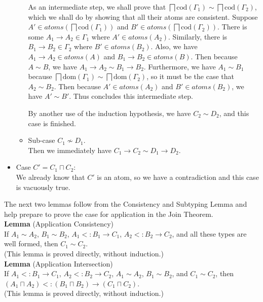 \documentclass{article}
\newcommand{\ATOMS}[1]{\mathit{atoms}(#1)}
\newcommand{\sqinter}[0]{\bigsqcap}
\begin{document}
\begin{itemize}
\begin{itemize}
    As an intermediate step, we shall prove that
    $\sqinter \mathrm{cod}(\Gamma_1) \sim \sqinter \mathrm{cod}(\Gamma_2)$,
    which we shall do by showing that all their atoms are consistent.
    Suppose $A' \in \ATOMS{\sqinter \mathrm{cod}(\Gamma_1)}$
    and $B' \in \ATOMS{\sqinter \mathrm{cod}(\Gamma_2)}$.
    There is some $A_1\to A_2 \in \Gamma_1$ where $A' \in \ATOMS{A_2}$.
    Similarly, there is $B_1 \to B_2 \in \Gamma_2$ where $B' \in \ATOMS{B_2}$.
    Also, we have $A_1 \to A_2 \in \ATOMS{A}$ and $B_1 \to B_2 \in \ATOMS{B}$.
    Then because $A \sim B$, we have $A_1 \to A_2 \sim B_1 \to B_2$.
    Furthermore, we have $A_1 \sim B_1$ because
    $\sqinter \mathrm{dom}(\Gamma_1) \sim \sqinter \mathrm{dom}(\Gamma_2)$,
    so it must be the case that $A_2 \sim B_2$.
    Then because $A' \in \ATOMS{A_2}$ and $B' \in \ATOMS{B_2}$, we
    have $A' \sim B'$. Thus concludes this intermediate step.

    By another use of the induction hypothesis, we have
    $C_2 \sim D_2$, and this case is finished.
    
  \item Sub-case $C_1 \not\sim D_1$.\\
    Then we immediately have $C_1 \to C_2 \sim D_1 \to D_2$.
  \end{itemize}
  
\item Case $C'=C_1\sqcap C_2$:\\
  We already know that $C'$ is an atom, so we have a contradiction
  and this case is vacuously true.
\end{itemize}

The next two lemmas follow from the Consistency and Subtyping Lemma
and help prepare to prove the case for application in the Join
Theorem. \\

\noindent \textbf{Lemma} (Application Consistency) \\
%
If $A_1 \sim A_2$, $B_1 \sim B_2$, $A_1 <: B_1 \to C_1$,
$A_2 <: B_2 \to C_2$, and all these types are well formed,
then $C_1 \sim C_2$.\\
(This lemma is proved directly, without induction.)\\

\noindent \textbf{Lemma} (Application Intersection) \\
%
If $A_1 <: B_1 \to C_1$, $A_2 <: B_2 \to C_2$, $A_1 \sim A_2$,
$B_1 \sim B_2$, and $C_1 \sim C_2$, then
$(A_1\sqcap A_2) <: (B_1 \sqcap B_2) \to (C_1 \sqcap C_2)$.\\
(This lemma is proved directly, without induction.) \\
\end{document}
